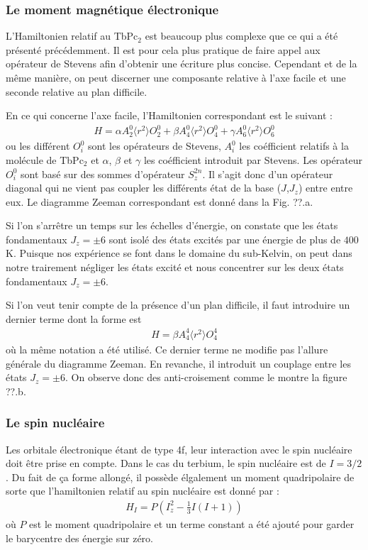 \subsubsection{Le moment magnétique électronique}
L'Hamiltonien relatif au TbPc$_2$ est beaucoup plus complexe que ce qui a été présenté précédemment. Il est pour cela plus pratique de faire appel aux opérateur de Stevens afin d'obtenir une écriture plus concise. Cependant et de la même manière, on peut discerner une composante relative à l'axe facile et une seconde relative au plan difficile. 

En ce qui concerne l'axe facile, l'Hamiltonien correspondant est le suivant :
\begin{eqnarray}
H = \alpha A_2^0 \langle r^2 \rangle O_2^0 + \beta A_4^0 \langle r^2 \rangle O_4^0 + \gamma A_6^0 \langle r^2 \rangle O_6^0
\end{eqnarray}
ou les différent $O_i^0$ sont les opérateurs de Stevens, $A_i^0$ les coéfficient relatifs à la molécule de TbPc$_2$ et $\alpha$, $\beta$ et $\gamma$ les coéfficient introduit par Stevens. Les opérateur $O^0_i$ sont basé sur des sommes d'opérateur $S_z^{2n}$. Il s'agit donc d'un opérateur diagonal qui ne vient pas coupler les différents état de la base ($J$,$J_z$) entre entre eux. Le diagramme Zeeman correspondant est donné dans la Fig. ??.a.

Si l'on s'arr\^etre un temps sur les échelles d'énergie, on constate que les états fondamentaux $J_z = \pm 6$ sont isolé des états excités par une énergie de plus de $400$\,K. Puisque nos expérience se font dans le domaine du sub-Kelvin, on peut dans notre trairement négliger les états excité et nous concentrer sur les deux états fondamentaux  $J_z = \pm 6$.

Si l'on veut tenir compte de la présence d'un plan difficile, il faut introduire un dernier terme dont la forme est
\begin{eqnarray}
H = \beta A_4^4 \langle r^2 \rangle O_4^4
\end{eqnarray}
où la m\^eme notation a été utilisé. Ce dernier terme ne modifie pas l'allure générale du diagramme Zeeman. En revanche, il introduit un couplage entre les états  $J_z = \pm 6$. On observe donc des anti-croisement comme le montre la figure ??.b.

\subsubsection{Le spin nucléaire}
Les orbitale électronique étant de type 4f, leur interaction avec le spin nucléaire doit \^etre prise en compte. Dans le cas du terbium, le spin nucléaire est de $I = 3/2$. Du fait de ça forme allongé, il possède élgalement un moment quadripolaire de sorte que l'hamiltonien relatif au spin nucléaire est donné par :
\begin{eqnarray}
H_I = P\left(I_z^2 - \frac{1}{3}I(I+1)\right)
\end{eqnarray}
où $P$ est le moment quadripolaire et un terme constant a été ajouté pour garder le barycentre des énergie sur zéro.

